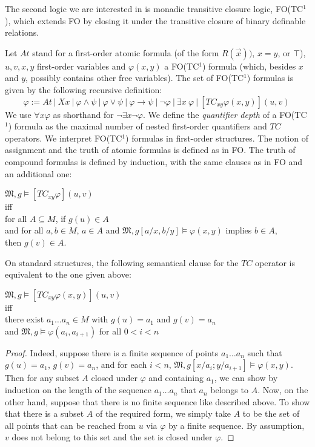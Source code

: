 \documentclass{LMCS}
\newcommand{\frM}{\mathfrak{M}}
\newcommand{\fo}{\textsf{FO}\xspace}
\newcommand{\fotc}{\textsf{FO(TC$^1$)}\xspace}
\begin{document}
The second logic we are interested in is monadic transitive
closure logic, \fotc, which extends \fo by closing it under the
transitive closure of binary definable relations.

\begin{defi}
[Syntax and semantics of \fotc]
    Let $At$ stand for a first-order atomic formula  (of the form
    $R(\vec{x}))$, $x=y$, or $\top$), $u,v,x,y$ first-order variables and $\varphi(x,y)$ a \fotc formula (which, besides $x$ and
    $y$, possibly contains other free variables). The set of \fotc
    formulas is given by the following recursive definition:
$$\varphi:= At ~|~ Xx ~|~ \varphi \wedge \psi ~|~ \varphi \vee \psi ~|~ \varphi
\rightarrow \psi ~|~ \neg \varphi ~|~ \exists x~ \varphi ~|~ [TC_{xy}
\varphi(x,y)](u,v) ~$$
We use $\forall x \varphi$ as shorthand for $\neg \exists x \neg \varphi$.
We define the \textit{quantifier depth} of a \fotc formula as the maximal
number of nested first-order quantifiers and $TC$ operators.
We interpret \fotc formulas in first-order structures. The notion of assignment and the truth of atomic formulas is defined as in \fo. The truth of compound formulas is defined by induction, with the same clauses as in \fo and an additional one:
\begin{center}
$\frM, g \models [TC_{xy} \varphi](u,v)$\\
iff\\
for all $A
\subseteq M$, if $g(u) \in A$\\
and for all $a, b \in M$, $a\in A$ and $\frM, g[a/x,b/y]
\models \varphi(x,y)$ implies $b\in A$,\\
then $g(v)\in A$.
\end{center}
\label{deftc}
\end{defi}


\begin{prop}
On standard structures, the following semantical clause for the $TC$ operator is equivalent to the one given above:
\begin{center}
$\frM, g \models [TC_{xy}\varphi(x,y)](u,v)$\\
iff\\
there exist $a_1 \ldots a_n \in M$ with $g(u)=a_1$ and $g(v)=a_n$\\
and $\frM, g \models \varphi(a_i,a_{i+1})$ for all $0<i<n$
\end{center}
\label{tcaltsem}
\end{prop}
\begin{proof}
Indeed, suppose there is a finite sequence of points $a_1\ldots
a_n$ such that $g(u)=a_1$, $g(v)=a_n$, and for each $i<n$,
$\frM,g[x/a_i;y/a_{i+1}]\models \varphi(x,y)$. Then for any subset
$A$ closed under $\varphi$ and containing $a_1$, we can show by
induction on the length of the sequence $a_1 \ldots a_n$ that
$a_n$ belongs to $A$. Now, on the other hand, suppose that there
is no finite sequence like described above. To show that there is
a subset $A$ of the required form, we simply take $A$ to be the
set of all points that can be reached from $u$ via $\varphi$ by a
finite sequence. By assumption, $v$ does not belong to this set
and the set is closed under $\varphi$.
\end{proof}
\end{document}
